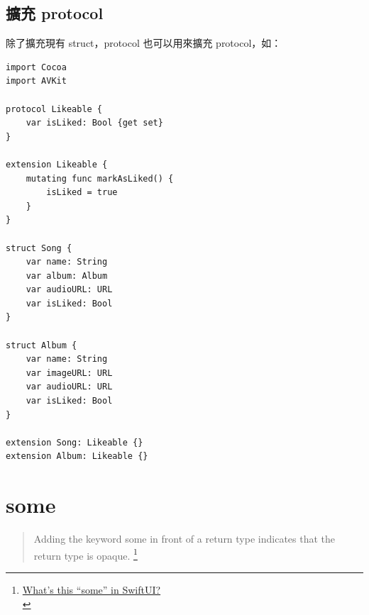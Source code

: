 \documentclass[a4paper,12pt]{article}
\begin{document}
\subsection{擴充 protocol}
\label{sec:org4531f71}
除了擴充現有 struct，protocol 也可以用來擴充 protocol，如：\\
\lstset{breaklines=true,language=swift,label= ,caption= ,captionpos=b,firstnumber=1,numbers=left}
\begin{lstlisting}
import Cocoa
import AVKit

protocol Likeable {
    var isLiked: Bool {get set}
}

extension Likeable {
    mutating func markAsLiked() {
        isLiked = true
    }
}

struct Song {
    var name: String
    var album: Album
    var audioURL: URL
    var isLiked: Bool
}

struct Album {
    var name: String
    var imageURL: URL
    var audioURL: URL
    var isLiked: Bool
}

extension Song: Likeable {}
extension Album: Likeable {}
\end{lstlisting}

\section{some}
\label{sec:org1b2d3b8}
\begin{verse}
Adding the keyword some in front of a return type indicates that the return type is opaque. \footnote{\href{https://medium.com/@PhiJay/whats-this-some-in-swiftui-34e2c126d4c4}{What’s this “some” in SwiftUI?}\\}\\
\end{verse}
\end{document}
